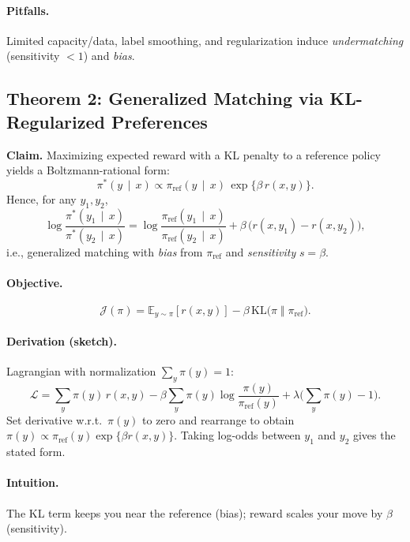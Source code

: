 \documentclass[11pt]{article}
\newcommand{\E}{\mathbb{E}}
\newcommand{\KL}{\mathrm{KL}}
\newcommand{\given}{\,\mid\,}
\begin{document}
\paragraph{Pitfalls.} Limited capacity/data, label smoothing, and regularization induce \emph{undermatching} (sensitivity $<1$) and \emph{bias}.

\subsection{Theorem 2: Generalized Matching via KL-Regularized Preferences}
\textbf{Claim.} Maximizing expected reward with a KL penalty to a reference policy yields a Boltzmann-rational form:
\begin{equation*}
\pi^*(y\given x)\propto \pi_{\mathrm{ref}}(y\given x)\,\exp\{\beta\, r(x,y)\}.
\end{equation*}
Hence, for any $y_1,y_2$,
\begin{equation*}
\log\frac{\pi^*(y_1\given x)}{\pi^*(y_2\given x)}
=\log\frac{\pi_{\mathrm{ref}}(y_1\given x)}{\pi_{\mathrm{ref}}(y_2\given x)}+\beta\,\big(r(x,y_1)-r(x,y_2)\big),
\end{equation*}
i.e., generalized matching with \emph{bias} from $\pi_{\mathrm{ref}}$ and \emph{sensitivity} $s=\beta$.

\paragraph{Objective.}
\begin{equation*}
\mathcal{J}(\pi)=\E_{y\sim\pi}[r(x,y)] - \beta\,\KL\!\big(\pi\;\Vert\;\pi_{\mathrm{ref}}\big).
\end{equation*}

\paragraph{Derivation (sketch).}
Lagrangian with normalization $\sum_y \pi(y)=1$:
\[
\mathcal{L}=\sum_y \pi(y)\,r(x,y) - \beta \sum_y \pi(y)\log\frac{\pi(y)}{\pi_{\mathrm{ref}}(y)} + \lambda\Big(\sum_y \pi(y)-1\Big).
\]
Set derivative w.r.t.\ $\pi(y)$ to zero and rearrange to obtain
$\pi(y)\propto \pi_{\mathrm{ref}}(y)\exp\{\beta r(x,y)\}$.
Taking log-odds between $y_1$ and $y_2$ gives the stated form.

\paragraph{Intuition.} The KL term keeps you near the reference (bias); reward scales your move by $\beta$ (sensitivity).
\end{document}
